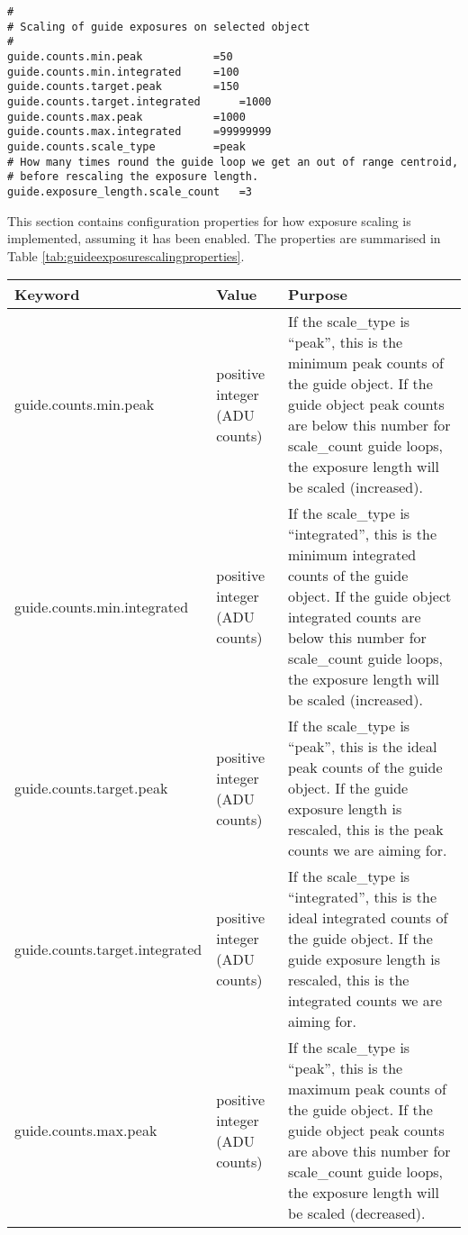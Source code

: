 \documentclass[10pt,a4paper]{article}
\begin{document}
\begin{verbatim}
#
# Scaling of guide exposures on selected object
#
guide.counts.min.peak			=50
guide.counts.min.integrated		=100
guide.counts.target.peak		=150
guide.counts.target.integrated		=1000
guide.counts.max.peak			=1000
guide.counts.max.integrated		=99999999
guide.counts.scale_type			=peak
# How many times round the guide loop we get an out of range centroid, 
# before rescaling the exposure length.
guide.exposure_length.scale_count	=3
\end{verbatim}

This section contains configuration properties for how exposure scaling is implemented, assuming it has been enabled. 
The properties are summarised in Table \ref{tab:guideexposurescalingproperties}.

\begin{table}[!h]
\begin{center}
\begin{tabular}{|l|l|p{20em}|}
\hline
{\bf Keyword}              & {\bf Value} & {\bf Purpose} \\ \hline
guide.counts.min.peak               & positive integer (ADU counts)    & If the scale\_type is ``peak'', this is the minimum peak counts of the guide object. If the guide object peak counts are below this number for scale\_count guide loops, the exposure length will be scaled (increased).\\ \hline
guide.counts.min.integrated         & positive integer (ADU counts)    & If the scale\_type is ``integrated'', this is the minimum integrated counts of the guide object. If the guide object integrated counts are below this number for scale\_count guide loops, the exposure length will be scaled (increased).\\ \hline
guide.counts.target.peak            & positive integer (ADU counts)    & If the scale\_type is ``peak'', this is the ideal peak counts of the guide object. If the guide exposure length is rescaled, this is the peak counts we are aiming for. \\ \hline
guide.counts.target.integrated      & positive integer (ADU counts)    & If the scale\_type is ``integrated'', this is the ideal integrated counts of the guide object. If the guide exposure length is rescaled, this is the integrated counts we are aiming for. \\ \hline
guide.counts.max.peak               & positive integer (ADU counts)    & If the scale\_type is ``peak'', this is the maximum peak counts of the guide object. If the guide object peak counts are above this number for scale\_count guide loops, the exposure length will be scaled (decreased).\\ \hline

\end{tabular}
\end{center}
\end{table}
\end{document}
